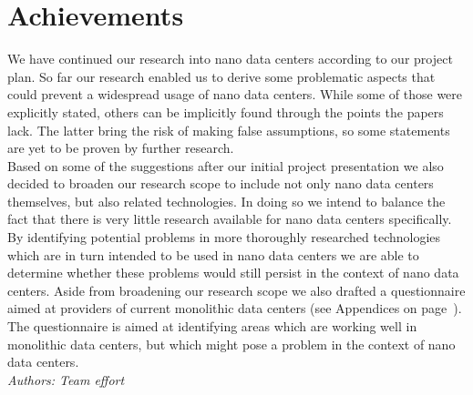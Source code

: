 \documentclass[sigchi-a, authorversion]{acmart}
\begin{document}
\section{Achievements}
We have continued our research into nano data centers according to our project plan. So far our research enabled us to derive some problematic aspects that could prevent a widespread usage of nano data centers. While some of those were explicitly stated, others can be implicitly found through the points the papers lack. The latter bring the risk of making false assumptions, so some statements are yet to be proven by further research. \\
Based on some of the suggestions after our initial project presentation we also decided to broaden our research scope to include not only nano data centers themselves, but also related technologies. In doing so we intend to balance the fact that there is very little research available for nano data centers specifically. By identifying potential problems in more thoroughly researched technologies which are in turn intended to be used in nano data centers we are able to determine whether these problems would still persist in the context of nano data centers.
Aside from broadening our research scope we also drafted a questionnaire aimed at providers of current monolithic data centers (see Appendices on page~\pageref{appendix:quest}). The questionnaire is aimed at identifying areas which are working well in monolithic data centers, but which might pose a problem in the context of nano data centers.\\
\textit{Authors: Team effort}\\
\end{document}
